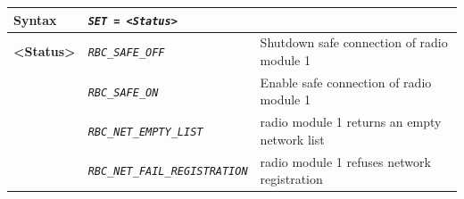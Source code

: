 \documentclass{template/openetcs}
\begin{document}
\begin{itemize}
\begin{longtable}{|l|l|l|}
				\hline
								
					\begin{minipage}[t]{0.22\linewidth} \textbf{Syntax}	\end{minipage}
				&	\multicolumn{2}{l|}{ \begin{minipage}[t]{0.78\linewidth} \emph{\texttt{SET = <Status>}}  \end{minipage} } \\
					
				\hline
				
					\multirow{1}{*}{ \begin{minipage}[t]{0.22\linewidth} \textbf{<Status>} \end{minipage} }
				&	\begin{minipage}[t]{0.40\linewidth} \emph{\texttt{RBC\_SAFE\_OFF}} \end{minipage}
				&	\begin{minipage}[t]{0.38\linewidth} Shutdown safe connection of radio module 1 \end{minipage} \\
					
				\hline
				
				&	\begin{minipage}[t]{0.40\linewidth}\emph{\texttt{RBC\_SAFE\_ON}} \end{minipage}
				&	\begin{minipage}[t]{0.38\linewidth} Enable safe connection of radio module 1 \end{minipage} \\
				
				\hline
				
				&	\begin{minipage}[t]{0.40\linewidth} \emph{\texttt{RBC\_NET\_EMPTY\_LIST}} \end{minipage}
				&	\begin{minipage}[t]{0.38\linewidth} radio module 1 returns an empty network list \end{minipage} \\
				
				\hline
				
				&	\begin{minipage}[t]{0.40\linewidth} \emph{\texttt{RBC\_NET\_FAIL\_REGISTRATION}} \end{minipage}
				&	\begin{minipage}[t]{0.38\linewidth} radio module 1 refuses network registration \end{minipage} \\ 
				

\end{longtable}
\end{itemize}
\end{document}
